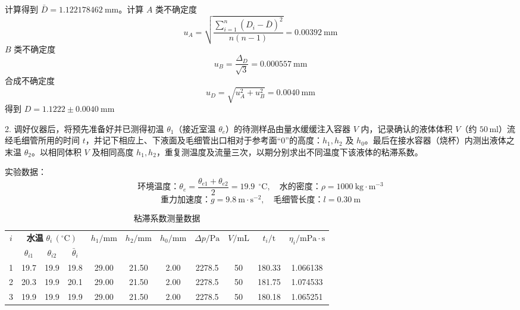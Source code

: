 \documentclass[12pt]{article}
\renewcommand{\arraystretch}{1.5}
\begin{document}
计算得到 $\bar{D}=1.122178462\ \mathrm{mm}$。计算 $A$ 类不确定度
\begin{equation}
    u_A=\sqrt{\frac{\sum_{i=1}^n(D_i-\bar D)^2}{n(n-1)}}=0.00392\ \mathrm{mm}
\end{equation}
$B$ 类不确定度
\begin{equation}
    u_B=\frac{\Delta_D}{\sqrt 3}=0.000557\ \mathrm{mm}
\end{equation}
合成不确定度
\begin{equation}
    u_D=\sqrt{u_A^2+u_B^2}=0.0040\ \mathrm{mm}
\end{equation}
得到 $D=1.1222\pm 0.0040\ \mathrm{mm} $

2. 调好仪器后，将预先准备好并已测得初温 $\theta_1$（接近室温 $\theta_e$）的待测样品由量水缓缓注入容器 $V$ 内，记录确认的液体体积 $V$（约 $50\,\mathrm{ml}$）流经毛细管所用的时间 $t$，并记下相应上、下液面及毛细管出口相对于参考面“0”的高度：$h_1, h_2$ 及 $h_0$。最后在接水容器（烧杯）内测出液体之末温 $\theta_2$。以相同体积 $V$ 及相同高度 $h_1, h_2$，重复测温度及流量三次，以期分别求出不同温度下该液体的粘滞系数。

实验数据：
$$
环境温度：\theta_e=\frac{\theta_{e1}+\theta_{e2}}{2}=19.9\ ~^\circ\mathrm C,\quad 水的密度：\rho=1000\ \mathrm{kg}\cdot\mathrm{m^{-3}}
$$
$$
重力加速度： g=9.8\ \mathrm{m\cdot s^{-2}},\quad 毛细管长度： l=0.30\ \mathrm m
$$
\begin{table}[h]
    \centering
    \renewcommand{\arraystretch}{1.3}
    \caption{粘滞系数测量数据}
    \begin{tabular}{c|c|c|c|c|c|c|c|c|c|c}
    \multirow{2}{*}{$i$} 
    & \multicolumn{3}{c|}{\textbf{水温} $\theta_i\, (^\circ\mathrm{C})$} 
    & \multirow{2}{*}{$h_1/ \mathrm{mm}$} 
    & \multirow{2}{*}{$h_2/ \mathrm{mm}$} 
    & \multirow{2}{*}{$h_0/ \mathrm{mm}$} 
    & \multirow{2}{*}{$\Delta p/ \mathrm{Pa}$} 
    & \multirow{2}{*}{$V/ \mathrm{mL}$} 
    & \multirow{2}{*}{$t_i/ \mathrm{t}$} 
    & \multirow{2}{*}{$\eta_i/ \mathrm{mPa\cdot s}$} \\ \cline{2-4}
    & $\theta_{i1}$ & $\theta_{i2}$ & $\bar{\theta}_i$ &  &  &  &  &  &  &  \\ \hline \hline
    1 & 19.7 & 19.9 & 19.8 & 29.00 & 21.50 & 2.00 & 2278.5 & 50 & 180.33 & 1.066138 \\ \hline 
2 & 20.3 & 19.9 & 20.1 & 29.00 & 21.50 & 2.00 & 2278.5 & 50 & 181.75 & 1.074533 \\ \hline
3 & 19.9 & 19.9 & 19.9 & 29.00 & 21.50 & 2.00 & 2278.5 & 50 & 180.18 & 1.065251 
    \end{tabular}
\end{table}
\end{document}
